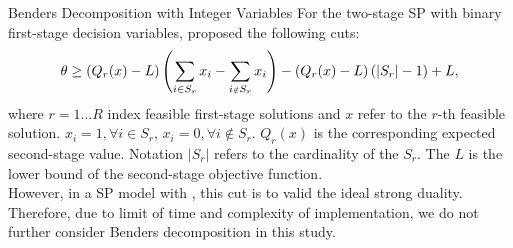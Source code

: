 \documentclass[aspectratio=169]{beamer}
\begin{document}
    \begin{frame}{Benders Decomposition with Integer Variables}
    For the two-stage SP with binary first-stage decision variables, \cite{laporte1993integer} proposed the following cuts:
    \begin{align}
    \scriptsize
        \theta \geq \left( Q_{r}(x) - L \right) \left( \sum_{i \in S_r} x_i - \sum_{i \notin S_r} x_i \right) - \left( Q_{r}(x) - L \right) (|S_r| - 1) + L, \label{eq:integer_benders_cut} 
    \end{align}
    where $r = 1 \dots R$ index feasible first-stage solutions and $x$ refer to the $r$-th feasible solution. $x_i = 1, \forall i \in S_r$, $x_i = 0, \forall i \notin S_r$. $Q_r(x)$ is the corresponding expected second-stage value. Notation $|S_r|$ refers to the cardinality of the $S_r$. The $L$ is the lower bound of the second-stage objective function. \\
    However, in a SP model with , this cut is  to valid the ideal strong duality. Therefore, due to limit of time and complexity of implementation, we do not further consider Benders decomposition in this study.
\end{frame}
\end{document}
